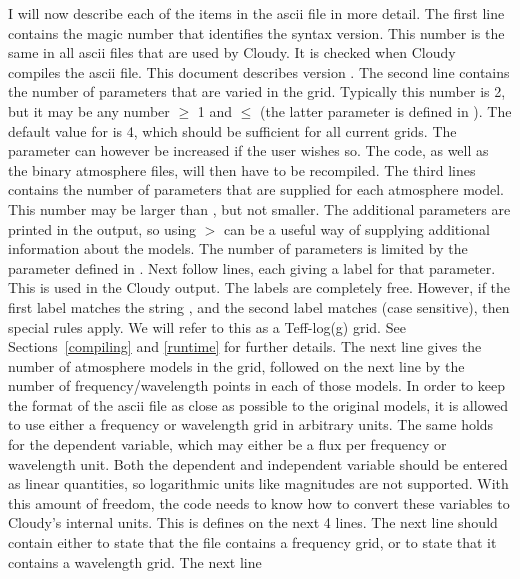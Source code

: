 I will now describe each of the items in the ascii file in more detail. The
first line contains the magic number that identifies the syntax version. This
number is the same in all ascii files that are used by Cloudy. It is checked
when Cloudy compiles the ascii file. This document describes version
. The second line contains the number of parameters
 that are varied in the grid. Typically this number is 2, but
it may be any number $\geq$ 1 and $\leq$  (the latter
parameter is defined in ). The default value for
 is 4, which should be sufficient for all current grids. The
parameter can however be increased if the user wishes so. The code, as well as
the binary atmosphere files, will then have to be recompiled. The third lines
contains the number of parameters  that are supplied for each
atmosphere model. This number may be larger than , but not
smaller. The additional parameters are printed in the output, so using
 $>$  can be a useful way of supplying
additional information about the models. The number of parameters is limited
by the parameter  defined in . Next
follow  lines, each giving a label for that parameter. This
is used in the Cloudy output. The labels are completely free. However, if the
first label matches the string , and the second label matches
 (case sensitive), then special rules apply. We will refer
to this as a Teff-log(g) grid. See Sections~\ref{compiling} and \ref{runtime}
for further details. The next line gives the number of atmosphere models
 in the grid, followed on the next line by the number of
frequency/wavelength points  in each of those models. In
order to keep the format of the ascii file as close as possible to the
original models, it is allowed to use either a frequency or wavelength grid in
arbitrary units. The same holds for the dependent variable, which may either
be a flux per frequency or wavelength unit. Both the dependent and independent
variable should be entered as linear quantities, so logarithmic units like
magnitudes are not supported. With this amount of freedom, the code needs to
know how to convert these variables to Cloudy's internal units. This is
defines on the next 4 lines. The next line should contain either
 to state that the file contains a frequency grid, or
 to state that it contains a wavelength grid. The next line
